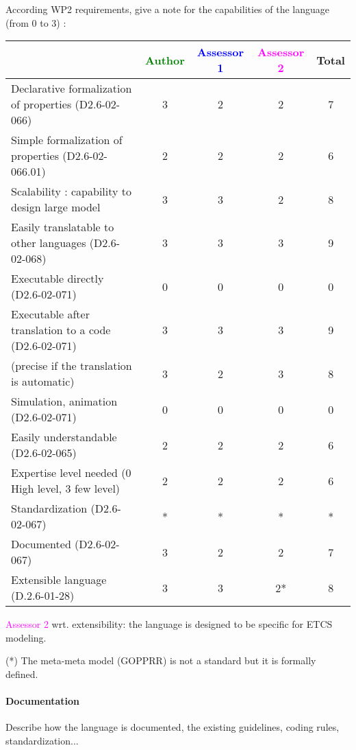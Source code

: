 According WP2 requirements, give a note for the capabilities of the language (from 0 to 3) :

\begin{tabular}{|l | c | c | c | c|}
  \hline
  & \textcolor{green}{Author} & \textcolor{blue}{Assessor 1} & \textcolor{magenta}{Assessor 2} & Total \\
  \hline
  Declarative formalization of properties (D2.6-02-066) &3 &2 & 2& 7 \\
  \hline
  Simple formalization of properties (D2.6-02-066.01) &2 &2 & 2& 6 \\
  \hline
  Scalability : capability to design large model &3 &3 & 2& 8 \\
  \hline
  Easily translatable to other languages (D2.6-02-068) &3 &3 & 3& 9 \\
  \hline
  Executable directly (D2.6-02-071) &0 &0 & 0& 0 \\
  \hline
  Executable after translation to a code (D2.6-02-071) &3 &3 & 3& 9 \\
  (precise if the translation is automatic) &3 &2 & 3& 8 \\
  \hline
  Simulation, animation (D2.6-02-071) &0 &0 & 0& 0 \\
  \hline
  Easily understandable (D2.6-02-065) &2 &2 & 2& 6 \\
  \hline
  Expertise level needed (0 High level, 3 few level) &2 &2 & 2& 6 \\
  \hline
  Standardization (D2.6-02-067) &* &* & *& * \\
  \hline
  Documented (D2.6-02-067) &3 &2 & 2& 7 \\
  \hline
  Extensible language (D.2.6-01-28) &3 &3 & 2*& 8\\
  \hline
\end{tabular}

\textcolor{magenta}{Assessor 2} wrt. extensibility: the language is designed to
be specific for ETCS modeling.

\begin{author_comment}
(*) The meta-meta model (GOPPRR) is not a standard but it is formally defined.
\end{author_comment}

\paragraph{Documentation} Describe how the language is documented, the existing guidelines, coding rules, standardization...


